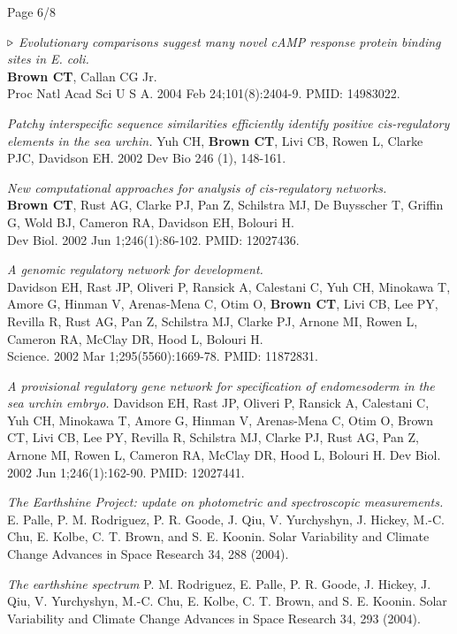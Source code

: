 \documentclass[margin,line]{resume}
\begin{document}
\begin{resume}
\vspace{3cm}
{\centerline {Page 6/8}}

\newpage

{\color{red} ${\bf \triangleright}$}
{\em Evolutionary comparisons suggest
many novel cAMP response protein binding sites in {\em E. coli}.}\\
{\bf Brown CT}, Callan CG Jr.\\
Proc Natl Acad Sci U S A. 2004 Feb 24;101(8):2404-9.  PMID: 14983022.

{\em Patchy interspecific sequence similarities efficiently identify positive cis-regulatory elements in the sea urchin.}
Yuh CH, {\bf Brown CT}, Livi CB, Rowen L, Clarke PJC, Davidson EH.
2002 Dev Bio 246 (1), 148-161.

  {\em New
computational approaches for analysis of {\em cis}-regulatory networks.}  \\
{\bf Brown CT}, Rust AG, Clarke PJ, Pan Z, Schilstra MJ, De Buysscher
T, Griffin G, Wold BJ, Cameron RA, Davidson EH, Bolouri H.\\
Dev Biol. 2002 Jun 1;246(1):86-102.  PMID: 12027436.

{\em A genomic
regulatory network for development.}\\
Davidson EH, Rast JP, Oliveri P, Ransick A, Calestani C, Yuh CH,
Minokawa T, Amore G, Hinman V, Arenas-Mena C, Otim O, {\bf Brown CT}, Livi
CB, Lee PY, Revilla R, Rust AG, Pan Z, Schilstra MJ, Clarke PJ, Arnone
MI, Rowen L, Cameron RA, McClay DR, Hood L, Bolouri H.
\\Science. 2002 Mar
1;295(5560):1669-78.  PMID: 11872831.

{\em A provisional regulatory gene network for specification of endomesoderm in the sea urchin embryo.}
Davidson EH, Rast JP, Oliveri P, Ransick A, Calestani C, Yuh CH, Minokawa T, Amore G, Hinman V, Arenas-Mena C, Otim O, Brown CT, Livi CB, Lee PY, Revilla R, Schilstra MJ, Clarke PJ, Rust AG, Pan Z, Arnone MI, Rowen L, Cameron RA, McClay DR, Hood L, Bolouri H.
Dev Biol. 2002 Jun 1;246(1):162-90.
PMID: 12027441.

{\em The Earthshine Project: update on photometric and spectroscopic measurements.}
 E. Palle, P. M. Rodriguez, P. R. Goode, J. Qiu, V. Yurchyshyn, J. Hickey, M.-C. Chu, E. Kolbe, C. T. Brown, and S. E. Koonin.
Solar Variability and Climate Change Advances in Space Research 34, 288 (2004).

{\em The earthshine spectrum}
P. M. Rodriguez, E. Palle, P. R. Goode, J. Hickey, J. Qiu, V. Yurchyshyn, M.-C. Chu, E. Kolbe, C. T. Brown, and S. E. Koonin.
Solar Variability and Climate Change Advances in Space Research 34, 293 (2004).


\end{resume}
\end{document}
